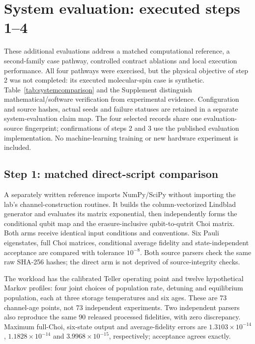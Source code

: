 \documentclass[11pt,a4paper]{article}
\begin{document}
\section{System evaluation: executed steps 1--4}
\label{sec:systemeval}
These additional evaluations address a matched computational reference, a second-family case pathway, controlled contract ablations and local execution performance. All four pathways were exercised, but the physical objective of step 2 was not completed: its executed molecular-spin case is synthetic. Table~\ref{tab:systemcomparison} and the Supplement distinguish mathematical/software verification from experimental evidence. Configuration and source hashes, actual seeds and failure statuses are retained in a separate system-evaluation claim map. The four selected records share one evaluation-source fingerprint; confirmations of steps 2 and 3 use the published evaluation implementation. No machine-learning training or new hardware experiment is included.

\subsection{Step 1: matched direct-script comparison}
A separately written reference imports NumPy/SciPy without importing the lab's channel-construction routines. It builds the column-vectorized Lindblad generator and evaluates its matrix exponential, then independently forms the conditional qubit map and the erasure-inclusive qubit-to-qutrit Choi matrix. Both arms receive identical input conditions and conventions. Six Pauli eigenstates, full Choi matrices, conditional average fidelity and state-independent acceptance are compared with tolerance $10^{-8}$. Both source parsers check the same raw SHA-256 hashes; the direct arm is not deprived of source-integrity checks.

The workload has the calibrated Teller operating point and twelve hypothetical Markov profiles: four joint choices of population rate, detuning and equilibrium population, each at three storage temperatures and six ages. These are 73 channel-age points, not 73 independent experiments. Two independent parsers also reproduce the same 90 released processed fidelities, with zero discrepancy. Maximum full-Choi, six-state output and average-fidelity errors are $1.3103\times10^{-14}$, $1.1828\times10^{-14}$ and $3.9968\times10^{-15}$, respectively; acceptance agrees exactly.

\end{document}
